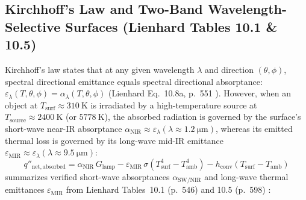 \begin{center}
\label{fig:12:planck-spectra}
\end{center}

\subsection{Kirchhoff's Law and Two-Band Wavelength-Selective Surfaces (Lienhard Tables 10.1 \& 10.5)}
Kirchhoff's law states that at any given wavelength $\lambda$ and direction $(\theta,\phi)$, spectral directional emittance equals spectral directional absorptance: $\varepsilon_\lambda(T,\theta,\phi) = \alpha_\lambda(T,\theta,\phi)$ (Lienhard Eq.~10.8a, p.~551 ). However, when an object at $T_{\mathrm{surf}} \approx \SI{310}{\kelvin}$ is irradiated by a high-temperature source at $T_{\mathrm{source}} \approx \SI{2400}{\kelvin}$ (or $\SI{5778}{\kelvin}$), the absorbed radiation is governed by the surface's short-wave near-IR absorptance $\alpha_{\mathrm{NIR}} \approx \varepsilon_\lambda(\lambda \approx \SI{1.2}{\micro\meter})$, whereas its emitted thermal loss is governed by its long-wave mid-IR emittance $\varepsilon_{\mathrm{MIR}} \approx \varepsilon_\lambda(\lambda \approx \SI{9.5}{\micro\meter})$:
\begin{equation}
  q''_{\mathrm{net,absorbed}} = \alpha_{\mathrm{NIR}}\,G_{\mathrm{lamp}} - \varepsilon_{\mathrm{MIR}}\,\sigma\left(T_{\mathrm{surf}}^4 - T_{\mathrm{amb}}^4\right) - h_{\mathrm{conv}}\left(T_{\mathrm{surf}} - T_{\mathrm{amb}}\right)
  \label{eq:12:selective-balance}
\end{equation}
 summarizes verified short-wave absorptances $\alpha_{\mathrm{SW/NIR}}$ and long-wave thermal emittances $\varepsilon_{\mathrm{MIR}}$ from Lienhard Tables~10.1 (p.~546) and 10.5 (p.~598) :


